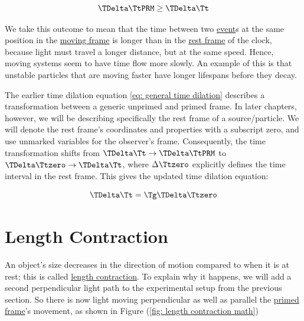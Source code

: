 \begin{equation}
	{\TDelta  \TtPRM  } \geq {\TDelta \Tt }
\end{equation}

We take this outcome to mean that the time between two \hyperlink{def-event}{event}s at the same position in the \hyperlink{def-Moving-Frame}{moving frame} is longer than in the \hyperlink{def-proper-frame}{rest frame} of the clock, because light must travel a longer distance, but at the same speed.
Hence, moving systems seem to have time flow more slowly.
An example of this is that unstable particles that are moving faster have longer lifespans before they decay.

The earlier time dilation equation \eqref{eq: general time dilation} describes a transformation between a generic unprimed and primed frame.
In later chapters, however, we will be describing specifically the rest frame of a source/particle.
We will denote the rest frame's coordinates and properties with a subscript zero, and use unmarked variables for the observer's frame.
Consequently, the time transformation shifts from $\TDelta \Tt \rightarrow \TDelta \TtPRM$ to $\TDelta \Ttzero \rightarrow \TDelta \Tt$, where $\Delta \Ttzero$ explicitly defines the time interval in the rest frame.
This gives the updated time dilation equation:

\begin{equation}
	\label{eq: time dilation}
	\TDelta  \Tt  = \Tg  \TDelta \Ttzero
\end{equation}

\section{Length Contraction} \label{sect: Length Contraction}

An object's size decreases in the direction of motion compared to when it is at rest; this is called \hyperlink{def-length-contraction}{length contraction}.
To explain why it happens, we will add a second perpendicular light path to the experimental setup from the previous section.
So there is now light moving perpendicular as well as parallel the \hyperlink{def-Primed-Frame}{primed frame}'s movement, as shown in Figure (\ref{fig: length contraction math})


